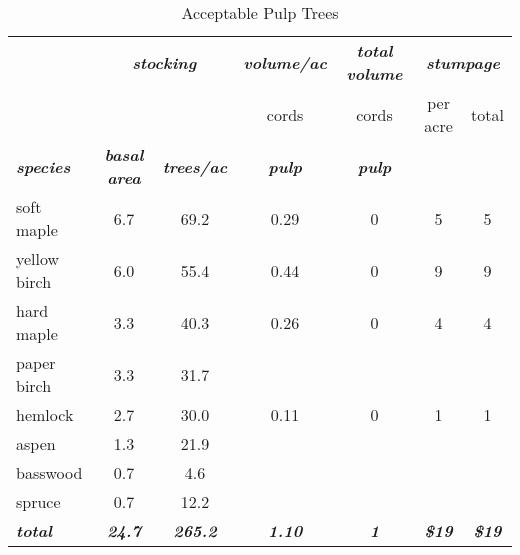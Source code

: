 \documentclass[landscape]{article}
\begin{document}
\begin{table}[H]

\caption{\label{tab:unnamed-chunk-35}Acceptable Pulp Trees}
\fontsize{10}{12}\selectfont
\begin{tabular}[t]{lcccccc}
\toprule
\multicolumn{1}{c}{\em{\textbf{ }}} & \multicolumn{2}{c}{\em{\textbf{stocking}}} & \multicolumn{1}{c}{\em{\textbf{volume/ac }}} & \multicolumn{1}{c}{\em{\textbf{total volume}}} & \multicolumn{2}{c}{\em{\textbf{stumpage}}} \\
\cmidrule(l{3pt}r{3pt}){2-3} \cmidrule(l{3pt}r{3pt}){4-4} \cmidrule(l{3pt}r{3pt}){5-5} \cmidrule(l{3pt}r{3pt}){6-7}
\multicolumn{3}{c}{ } & \multicolumn{1}{c}{cords} & \multicolumn{1}{c}{cords} & \multicolumn{1}{c}{per acre} & \multicolumn{1}{c}{total} \\
\cmidrule(l{3pt}r{3pt}){4-4} \cmidrule(l{3pt}r{3pt}){5-5} \cmidrule(l{3pt}r{3pt}){6-6} \cmidrule(l{3pt}r{3pt}){7-7}
\rowcolor[HTML]{DCDCDC}  \em{\textbf{species}} & \em{\textbf{basal area}} & \em{\textbf{trees/ac}} & \em{\textbf{pulp}} & \em{\textbf{pulp}} & \em{\textbf{ }} & \em{\textbf{ }}\\
\midrule
\rowcolor{gray!6}  soft maple & 6.7 & 69.2 & 0.29 & 0 & 5 & 5\\
 
yellow birch & 6.0 & 55.4 & 0.44 & 0 & 9 & 9\\
 
\rowcolor{gray!6}  hard maple & 3.3 & 40.3 & 0.26 & 0 & 4 & 4\\
 
paper birch & 3.3 & 31.7 &  &  &  & \\
 
\rowcolor{gray!6}  hemlock & 2.7 & 30.0 & 0.11 & 0 & 1 & 1\\
 
aspen & 1.3 & 21.9 &  &  &  & \\
 
\rowcolor{gray!6}  basswood & 0.7 & 4.6 &  &  &  & \\
 
spruce & 0.7 & 12.2 &  &  &  & \\
 
\rowcolor{gray!6}  \rowcolor[HTML]{DCDCDC}  \em{\textbf{total}} & \em{\textbf{24.7}} & \em{\textbf{265.2}} & \em{\textbf{1.10}} & \em{\textbf{1}} & \em{\textbf{\$19}} & \em{\textbf{\$19}}\\
\bottomrule
\end{tabular}
\end{table}
\end{document}
